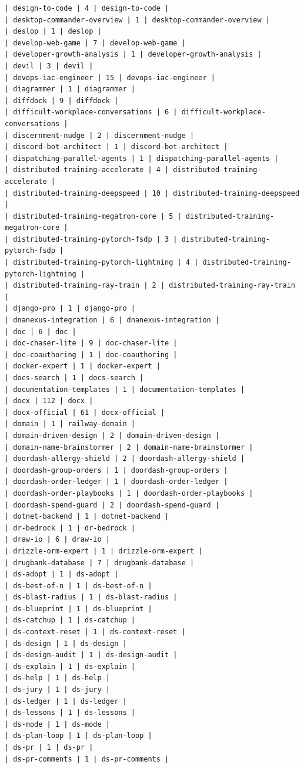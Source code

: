 \begin{Verbatim}[breaklines,breakanywhere,fontsize=\footnotesize]
| design-to-code | 4 | design-to-code |
| desktop-commander-overview | 1 | desktop-commander-overview |
| deslop | 1 | deslop |
| develop-web-game | 7 | develop-web-game |
| developer-growth-analysis | 1 | developer-growth-analysis |
| devil | 3 | devil |
| devops-iac-engineer | 15 | devops-iac-engineer |
| diagrammer | 1 | diagrammer |
| diffdock | 9 | diffdock |
| difficult-workplace-conversations | 6 | difficult-workplace-conversations |
| discernment-nudge | 2 | discernment-nudge |
| discord-bot-architect | 1 | discord-bot-architect |
| dispatching-parallel-agents | 1 | dispatching-parallel-agents |
| distributed-training-accelerate | 4 | distributed-training-accelerate |
| distributed-training-deepspeed | 10 | distributed-training-deepspeed |
| distributed-training-megatron-core | 5 | distributed-training-megatron-core |
| distributed-training-pytorch-fsdp | 3 | distributed-training-pytorch-fsdp |
| distributed-training-pytorch-lightning | 4 | distributed-training-pytorch-lightning |
| distributed-training-ray-train | 2 | distributed-training-ray-train |
| django-pro | 1 | django-pro |
| dnanexus-integration | 6 | dnanexus-integration |
| doc | 6 | doc |
| doc-chaser-lite | 9 | doc-chaser-lite |
| doc-coauthoring | 1 | doc-coauthoring |
| docker-expert | 1 | docker-expert |
| docs-search | 1 | docs-search |
| documentation-templates | 1 | documentation-templates |
| docx | 112 | docx |
| docx-official | 61 | docx-official |
| domain | 1 | railway-domain |
| domain-driven-design | 2 | domain-driven-design |
| domain-name-brainstormer | 2 | domain-name-brainstormer |
| doordash-allergy-shield | 2 | doordash-allergy-shield |
| doordash-group-orders | 1 | doordash-group-orders |
| doordash-order-ledger | 1 | doordash-order-ledger |
| doordash-order-playbooks | 1 | doordash-order-playbooks |
| doordash-spend-guard | 2 | doordash-spend-guard |
| dotnet-backend | 1 | dotnet-backend |
| dr-bedrock | 1 | dr-bedrock |
| draw-io | 6 | draw-io |
| drizzle-orm-expert | 1 | drizzle-orm-expert |
| drugbank-database | 7 | drugbank-database |
| ds-adopt | 1 | ds-adopt |
| ds-best-of-n | 1 | ds-best-of-n |
| ds-blast-radius | 1 | ds-blast-radius |
| ds-blueprint | 1 | ds-blueprint |
| ds-catchup | 1 | ds-catchup |
| ds-context-reset | 1 | ds-context-reset |
| ds-design | 1 | ds-design |
| ds-design-audit | 1 | ds-design-audit |
| ds-explain | 1 | ds-explain |
| ds-help | 1 | ds-help |
| ds-jury | 1 | ds-jury |
| ds-ledger | 1 | ds-ledger |
| ds-lessons | 1 | ds-lessons |
| ds-mode | 1 | ds-mode |
| ds-plan-loop | 1 | ds-plan-loop |
| ds-pr | 1 | ds-pr |
| ds-pr-comments | 1 | ds-pr-comments |

\end{Verbatim}
